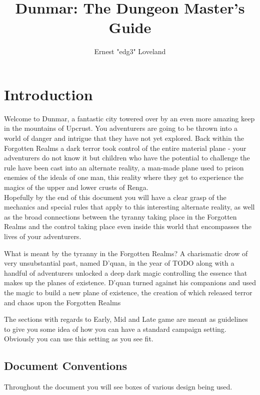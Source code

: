 \documentclass[10pt,twoside,twocolumn]{article}
\title{Dunmar: The Dungeon Master's Guide}
\author{Ernest "edg3" Loveland}
\begin{document}
\selectfont %

\maketitle
\tableofcontents

\section{Introduction}

Welcome to Dunmar, a fantastic city towered over by an even more amazing keep in the mountains of Upcrust. You adventurers are going to be thrown into a world of danger and intrigue that they have not yet explored. Back within the Forgotten Realms a dark terror took control of the entire material plane - your adventurers do not know it but children who have the potential to challenge the rule have been cast into an alternate reality, a man-made plane used to prison enemies of the ideals of one man, this reality where they get to experience the magics of the upper and lower crusts of Renga. \\

Hopefully by the end of this document you will have a clear grasp of the mechanics and special rules that apply to this interesting alternate reality, as well as the broad connections between the tyranny taking place in the Forgotten Realms and the control taking place even inside this world that encompasses the lives of your adventurers.\\

\begin{commentbox}{What is meant by the tyranny in the Forgotten Realms?}
A charismatic drow of very unsubstantial past, named D'quan, in the year of TODO along with a handful of adventurers unlocked a deep dark magic controlling the essence that makes up the planes of existence. D'quan turned against his companions and used the magic to build a new plane of existence, the creation of which released terror and chaos upon the Forgotten Realms
\end{commentbox}

The sections with regards to Early, Mid and Late game are meant as guidelines to give you some idea of how you can have a standard campaign setting. Obviously you can use this setting as you see fit.\\

\subsection{Document Conventions}
Throughout the document you will see boxes of various design being used. \\
\end{document}
